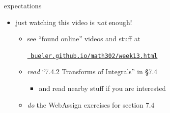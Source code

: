 \documentclass[urlcolor=blue,dvipsnames]{beamer}
\begin{document}
\begin{frame}{expectations}

\begin{itemize}
\item just watching this video is \emph{not} enough!
     \begin{itemize}
     \item see ``found online'' videos and stuff at

     \centerline{\href{https://bueler.github.io/math302/week13.html}{\tt \color{cyan} bueler.github.io/math302/week13.html}}
     \item \emph{read} ``7.4.2 Transforms of Integrals'' in \S7.4
         \begin{itemize}
         \item and read nearby stuff if you are interested
         \end{itemize}
     \item \emph{do} the WebAssign exercises for section 7.4
     \end{itemize}
\end{itemize}
\end{frame}
\end{document}
